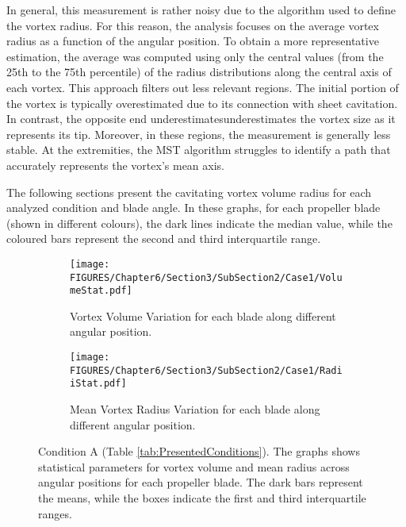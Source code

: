 In general, this measurement is rather noisy due to the algorithm used to define the vortex radius. For this reason, the analysis focuses on the average vortex radius as a function of the angular position.
To obtain a more representative estimation, the average was computed using only the central values (from the 25th to the 75th percentile) of the radius distributions along the central axis of each vortex. This approach filters out less relevant regions.
The initial portion of the vortex is typically overestimated due to its connection with sheet cavitation. In contrast, the opposite end underestimatesunderestimates the vortex size as it represents its tip.
Moreover, in these regions, the measurement is generally less stable. At the extremities, the MST algorithm struggles to identify a path that accurately represents the vortex's mean axis.

The following sections present the cavitating vortex volume radius for each analyzed condition and blade angle. 
In these graphs, for each propeller blade (shown in different colours), the dark lines indicate the median value, while the coloured bars represent the second and third interquartile range.

\begin{figure}[p]
    \centering
    \begin{subfigure}[b]{\textwidth}
        \centering
        \texttt{[image: FIGURES/Chapter6/Section3/SubSection2/Case1/VolumeStat.pdf]}
        \caption{Vortex Volume Variation for each blade along different angular position.}
        \label{fig:VolumeCase1}
    \end{subfigure}
    
    \vfill
    
    \begin{subfigure}[b]{\textwidth}
        \centering
        \texttt{[image: FIGURES/Chapter6/Section3/SubSection2/Case1/RadiiStat.pdf]}
        \caption{Mean Vortex Radius Variation for each blade along different angular position.}
        \label{fig:RadiiCase1}
    \end{subfigure}
    \label{fig:Case1}
    \caption{Condition A (Table \ref{tab:PresentedConditions}). The graphs shows statistical parameters for vortex volume and mean radius across angular positions for each propeller blade. The dark bars represent the means, while the boxes indicate the first and third interquartile ranges.}
\end{figure}

